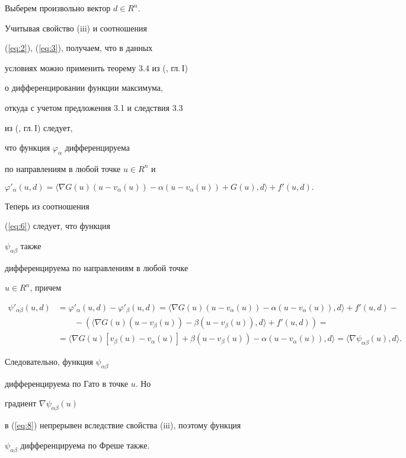 \begin{pf}


Выберем произвольно вектор $d \in R^{n}$.


Учитывая свойство (iii) и соотношения


(\ref{eq:2}), (\ref{eq:3}), получаем, что в данных


условиях можно применить теорему 3.4 из (\cite{DR90}, гл.\,I)


о дифференцировании функции максимума,


откуда с учетом предложения 3.1 и следствия 3.3


из (\cite{DR90}, гл.\,I) следует,


что функция $\varphi_{\alpha }$ дифференцируема


по направлениям в любой точке $u \in R^{n}$ и


$$


\varphi '_{\alpha }(u,d) =


\langle \nabla G(u) (u - v_{\alpha }(u)) -


\alpha (u - v_{\alpha }(u))+G(u), d \rangle +f'(u,d).


$$


Теперь из соотношения


(\ref{eq:6}) следует, что функция


$\psi_{\alpha \beta }$ также


дифференцируема по направлениям в любой точке


$u \in R^{n}$, причем


\begin{align*}


\psi '_{\alpha \beta }(u,d)


&=\varphi '_{\alpha }(u,d) - \varphi '_{\beta }(u,d)


=\langle \nabla G(u) (u - v_{\alpha }(u)) -


\alpha (u - v_{\alpha }(u)), d \rangle +f'(u,d)- \\


&\qquad - 


( \langle \nabla G(u) (u - v_{\beta }(u)) -


\beta (u - v_{\beta }(u)), d \rangle +f'(u,d))= \\


&= \langle \nabla G(u) [ v_{\beta }(u) - v_{\alpha }(u)] +


{\beta }(u - v_{\beta }(u)) -


{\alpha }(u - v_{\alpha }(u)), d \rangle


= \langle \nabla \psi_{\alpha \beta }(u), d \rangle.


\end{align*}


Следовательно, функция $\psi_{\alpha \beta }$


дифференцируема по Гато в точке $u$. Но


градиент $ \nabla \psi_{\alpha \beta }(u)$


в (\ref{eq:8}) непрерывен вследствие свойства (iii), поэтому функция


$\psi_{\alpha \beta }$ дифференцируема по Фреше также.


\end{pf}

